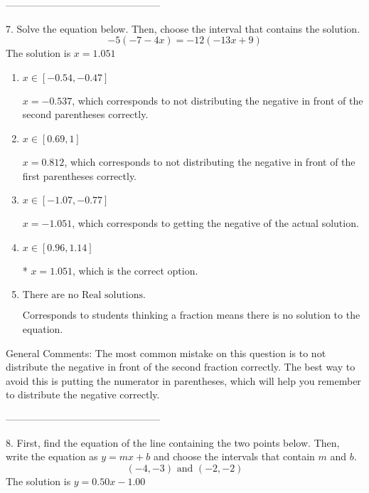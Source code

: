 \documentclass{article}[14pt]
\begin{document}
-----------------------------------------------

7. Solve the equation below. Then, choose the interval that contains the solution.
$$ -5(-7-4 x) = -12(-13 x+9) $$ 
The solution is $ x = 1.051 $ 

\begin{enumerate}[label=\Alph*.] 
\item $ x \in [-0.54, -0.47] $ 

  $x = -0.537$, which corresponds to not distributing the negative in front of the second parentheses correctly. 
\item $ x \in [0.69, 1] $ 

  $x = 0.812$, which corresponds to not distributing the negative in front of the first parentheses correctly. 
\item $ x \in [-1.07, -0.77] $ 

  $x = -1.051$, which corresponds to getting the negative of the actual solution. 
\item $ x \in [0.96, 1.14] $ 

 * $x = 1.051$, which is the correct option. 
\item $ \text{There are no Real solutions. } $ 

 Corresponds to students thinking a fraction means there is no solution to the equation. 
\end{enumerate} 
 
General Comments: The most common mistake on this question is to not distribute the negative in front of the second fraction correctly. The best way to avoid this is putting the numerator in parentheses, which will help you remember to distribute the negative correctly.

-----------------------------------------------

8. First, find the equation of the line containing the two points below. Then, write the equation as $ y=mx+b $ and choose the intervals that contain $m$ and $b$.
$$ (-4, -3) \text{ and } (-2, -2) $$ 
The solution is $ y = 0.50x - 1.00 $ 
\end{document}

